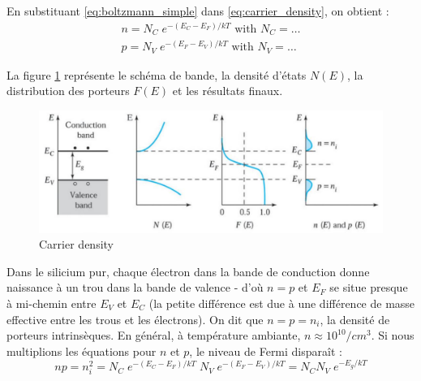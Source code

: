 En substituant \ref{eq:boltzmann_simple} dans \ref{eq:carrier_density}, on obtient :
\begin{equation} 
\begin{split}
n = N_C \; e^{-(E_C-E_F)/kT} \text{ with } N_C = \ldots\\
p = N_V \; e^{-(E_F-E_V)/kT} \text{ with } N_V = \ldots
\label{eq:carrier_density2}
\end{split}
\end{equation}

La figure \ref{fig:carrierdensity} représente le schéma de bande, la densité d'états $N(E)$, la distribution des porteurs $F(E)$ et les résultats finaux.

\begin{figure}[h!]
\centering
\includegraphics[width=12cm]{figures/ch01/carrierdensity.jpg}
\caption{Carrier density} 
\label{fig:carrierdensity}
\end{figure} 


Dans le silicium pur, chaque électron dans la bande de conduction donne naissance à un trou dans la bande de valence - d'où $n = p$ et $E_F$ se situe presque à mi-chemin entre $E_V$ et $E_C$ (la petite différence est due à une différence de masse effective entre les trous et les électrons). On dit que $n = p = n_i$, la densité de porteurs intrinsèques. En général, à température ambiante, $n \approx 10^{10}/cm^3$. Si nous multiplions les équations pour $n$ et $p$, le niveau de Fermi disparaît :
\begin{equation}
n p = n_i^2 = N_C \; e^{-(E_C-E_F)/kT} \; N_V \; e^{-(E_F-E_V)/kT} = N_C N_V \; e^{-E_g/kT}
\label{eq:np}
\end{equation}

